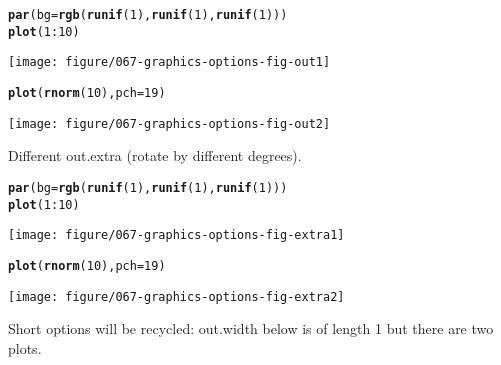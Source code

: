 \documentclass{article}\usepackage[]{graphicx}\usepackage[]{color}
\makeatletter
\newcommand{\hlnum}[1]{\textcolor[rgb]{0.686,0.059,0.569}{#1}}%
\newcommand{\hlopt}[1]{\textcolor[rgb]{0,0,0}{#1}}%
\newcommand{\hlstd}[1]{\textcolor[rgb]{0.345,0.345,0.345}{#1}}%
\newcommand{\hlkwc}[1]{\textcolor[rgb]{0.333,0.667,0.333}{#1}}%
\newcommand{\hlkwd}[1]{\textcolor[rgb]{0.737,0.353,0.396}{\textbf{#1}}}%
\newenvironment{kframe}{%
 \def\at@end@of@kframe{}%
 \ifinner\ifhmode%
  \def\at@end@of@kframe{\end{minipage}}%
  \begin{minipage}{\columnwidth}%
 \fi\fi%
 \def\FrameCommand##1{\hskip\@totalleftmargin \hskip-\fboxsep
 \colorbox{shadecolor}{##1}\hskip-\fboxsep
     \hskip-\linewidth \hskip-\@totalleftmargin \hskip\columnwidth}%
 \MakeFramed {\advance\hsize-\width
   \@totalleftmargin\z@ \linewidth\hsize
   \@setminipage}}%
 {\par\unskip\endMakeFramed%
 \at@end@of@kframe}
\newenvironment{knitrout}{}{} %
\makeatother
\begin{document}
\begin{knitrout}
\color{fgcolor}\begin{kframe}
\begin{alltt}
\hlkwd{par}\hlstd{(}\hlkwc{bg} \hlstd{=} \hlkwd{rgb}\hlstd{(}\hlkwd{runif}\hlstd{(}\hlnum{1}\hlstd{),} \hlkwd{runif}\hlstd{(}\hlnum{1}\hlstd{),} \hlkwd{runif}\hlstd{(}\hlnum{1}\hlstd{)))}
\hlkwd{plot}\hlstd{(}\hlnum{1}\hlopt{:}\hlnum{10}\hlstd{)}
\end{alltt}
\end{kframe}
\texttt{[image: figure/067-graphics-options-fig-out1]} 
\begin{kframe}\begin{alltt}
\hlkwd{plot}\hlstd{(}\hlkwd{rnorm}\hlstd{(}\hlnum{10}\hlstd{),} \hlkwc{pch} \hlstd{=} \hlnum{19}\hlstd{)}
\end{alltt}
\end{kframe}
\texttt{[image: figure/067-graphics-options-fig-out2]} 

\end{knitrout}


Different out.extra (rotate by different degrees).

\begin{knitrout}
\color{fgcolor}\begin{kframe}
\begin{alltt}
\hlkwd{par}\hlstd{(}\hlkwc{bg} \hlstd{=} \hlkwd{rgb}\hlstd{(}\hlkwd{runif}\hlstd{(}\hlnum{1}\hlstd{),} \hlkwd{runif}\hlstd{(}\hlnum{1}\hlstd{),} \hlkwd{runif}\hlstd{(}\hlnum{1}\hlstd{)))}
\hlkwd{plot}\hlstd{(}\hlnum{1}\hlopt{:}\hlnum{10}\hlstd{)}
\end{alltt}
\end{kframe}
\texttt{[image: figure/067-graphics-options-fig-extra1]} 
\begin{kframe}\begin{alltt}
\hlkwd{plot}\hlstd{(}\hlkwd{rnorm}\hlstd{(}\hlnum{10}\hlstd{),} \hlkwc{pch} \hlstd{=} \hlnum{19}\hlstd{)}
\end{alltt}
\end{kframe}
\texttt{[image: figure/067-graphics-options-fig-extra2]} 

\end{knitrout}


Short options will be recycled: out.width below is of length 1 but there are
two plots.
\end{document}
